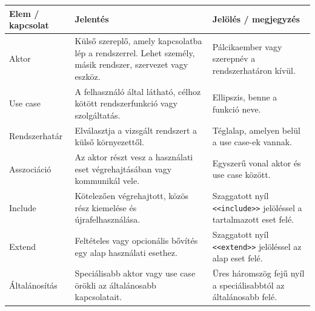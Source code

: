 \begin{tabularx}{\textwidth}{L{32mm}X X}
\toprule
\textbf{Elem / kapcsolat} & \textbf{Jelentés} & \textbf{Jelölés / megjegyzés} \\
\midrule
Aktor & Külső szereplő, amely kapcsolatba lép a rendszerrel. Lehet személy, másik rendszer, szervezet vagy eszköz. & Pálcikaember vagy szerepnév a rendszerhatáron kívül. \\
Use case & A felhasználó által látható, célhoz kötött rendszerfunkció vagy szolgáltatás. & Ellipszis, benne a funkció neve. \\
Rendszerhatár & Elválasztja a vizsgált rendszert a külső környezettől. & Téglalap, amelyen belül a use case-ek vannak. \\
Asszociáció & Az aktor részt vesz a használati eset végrehajtásában vagy kommunikál vele. & Egyszerű vonal aktor és use case között. \\
Include & Kötelezően végrehajtott, közös rész kiemelése és újrafelhasználása. & Szaggatott nyíl \texttt{<<include>>} jelöléssel a tartalmazott eset felé. \\
Extend & Feltételes vagy opcionális bővítés egy alap használati esethez. & Szaggatott nyíl \texttt{<<extend>>} jelöléssel az alap eset felé. \\
Általánosítás & Speciálisabb aktor vagy use case örökli az általánosabb kapcsolatait. & Üres háromszög fejű nyíl a speciálisabbtól az általánosabb felé. \\
\bottomrule
\end{tabularx}
